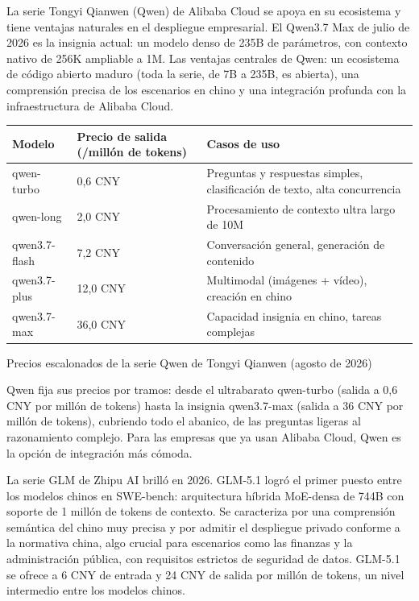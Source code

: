 
La serie Tongyi Qianwen (Qwen) de Alibaba Cloud se apoya en su ecosistema y tiene ventajas naturales en el despliegue empresarial. El Qwen3.7 Max de julio de 2026 es la insignia actual: un modelo denso de 235B de parámetros, con contexto nativo de 256K ampliable a 1M. Las ventajas centrales de Qwen: un ecosistema de código abierto maduro (toda la serie, de 7B a 235B, es abierta), una comprensión precisa de los escenarios en chino y una integración profunda con la infraestructura de Alibaba Cloud.

\begin{center}
\begin{tabularx}{\linewidth}{|X|X|X|}
\hline
\textbf{Modelo} & \textbf{Precio de salida (/millón de tokens)} & \textbf{Casos de uso} \tabularnewline
\hline
qwen-turbo & 0,6 CNY & Preguntas y respuestas simples, clasificación de texto, alta concurrencia \tabularnewline
qwen-long & 2,0 CNY & Procesamiento de contexto ultra largo de 10M \tabularnewline
qwen3.7-flash & 7,2 CNY & Conversación general, generación de contenido \tabularnewline
qwen3.7-plus & 12,0 CNY & Multimodal (imágenes + vídeo), creación en chino \tabularnewline
qwen3.7-max & 36,0 CNY & Capacidad insignia en chino, tareas complejas \tabularnewline
\hline
\end{tabularx}
\end{center}

\begin{center}\small\color{gray}Precios escalonados de la serie Qwen de Tongyi Qianwen (agosto de 2026)\end{center}

Qwen fija sus precios por tramos: desde el ultrabarato qwen-turbo (salida a 0,6 CNY por millón de tokens) hasta la insignia qwen3.7-max (salida a 36 CNY por millón de tokens), cubriendo todo el abanico, de las preguntas ligeras al razonamiento complejo. Para las empresas que ya usan Alibaba Cloud, Qwen es la opción de integración más cómoda.


La serie GLM de Zhipu AI brilló en 2026. GLM-5.1 logró el primer puesto entre los modelos chinos en SWE-bench: arquitectura híbrida MoE-densa de 744B con soporte de 1 millón de tokens de contexto. Se caracteriza por una comprensión semántica del chino muy precisa y por admitir el despliegue privado conforme a la normativa china, algo crucial para escenarios como las finanzas y la administración pública, con requisitos estrictos de seguridad de datos. GLM-5.1 se ofrece a 6 CNY de entrada y 24 CNY de salida por millón de tokens, un nivel intermedio entre los modelos chinos.

